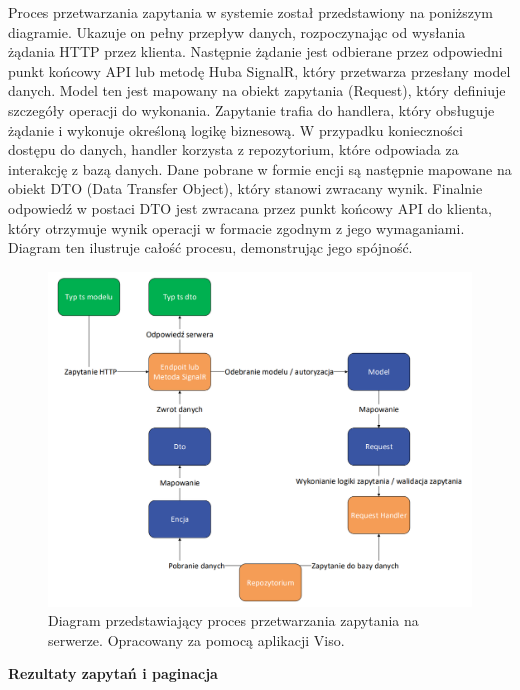 \documentclass[twoside]{projektInzynierskiMS1}
\begin{document}
\newpage

\noindent
Proces przetwarzania zapytania w systemie został przedstawiony na poniższym diagramie. Ukazuje on pełny przepływ danych, rozpoczynając od wysłania żądania HTTP przez klienta. Następnie żądanie jest odbierane przez odpowiedni punkt końcowy API lub metodę Huba SignalR, który przetwarza przesłany model danych. Model ten jest mapowany na obiekt zapytania (Request), który definiuje szczegóły operacji do wykonania. Zapytanie trafia do handlera, który obsługuje żądanie i wykonuje określoną logikę biznesową. W przypadku konieczności dostępu do danych, handler korzysta z repozytorium, które odpowiada za interakcję z bazą danych. Dane pobrane w formie encji są następnie mapowane na obiekt DTO (Data Transfer Object), który stanowi zwracany wynik. Finalnie odpowiedź w postaci DTO jest zwracana przez punkt końcowy API do klienta, który otrzymuje wynik operacji w formacie zgodnym z jego wymaganiami. Diagram ten ilustruje całość procesu, demonstrując jego spójność.

\vspace{0.5cm}
\begin{figure}[h!]
    \centering
    \includegraphics[width=1\textwidth]{images/diagram_back.png}
    \caption{Diagram przedstawiający proces przetwarzania zapytania na serwerze. Opracowany za pomocą aplikacji Viso.}
\end{figure}

\newpage

\noindent \textbf{Rezultaty zapytań i paginacja}\\
\end{document}
